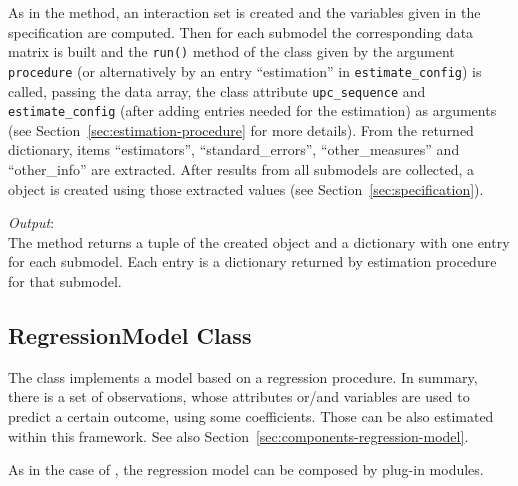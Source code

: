 As in the  method, an interaction set is created and the
variables given in the specification are computed. Then for each submodel the
corresponding data matrix is built and the \verb|run()| method of the class
given by the argument \verb|procedure| (or alternatively by an entry
``estimation'' in \verb|estimate_config|) is called, passing the data array,
the class attribute \verb|upc_sequence| and \verb|estimate_config| (after
adding entries needed for the estimation) as arguments (see
Section~\ref{sec:estimation-procedure} for more details).  From the returned
dictionary, items ``estimators'', ``standard_errors'', ``other_measures'' and
``other_info'' are extracted. After results from all submodels are collected,
a  object is created using those extracted values (see Section~\ref{sec:specification}).

{\it Output}:~\\[1mm]
The method returns a tuple of the created  object and a
dictionary with one entry for each submodel. 
Each entry is a dictionary returned by estimation procedure for that submodel.

\subsection{RegressionModel Class}
%
\label{sec:regression-model}
The  class implements a model based on a regression
procedure. In summary, there is a set of observations, whose attributes or/and
variables are used to predict a certain outcome, using some coefficients.
Those can be also estimated within this framework. See also Section~\ref{sec:components-regression-model}.

As in the case of , the regression model can be composed by
plug-in modules.

